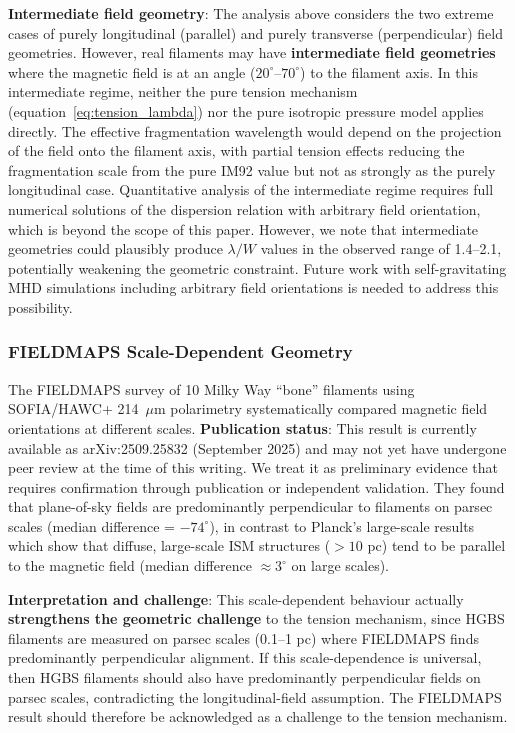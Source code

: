 \documentclass[11pt,a4paper]{article}
\begin{document}
\textbf{Intermediate field geometry}: The analysis above considers the two extreme cases of purely longitudinal (parallel) and purely transverse (perpendicular) field geometries. However, real filaments may have \textbf{intermediate field geometries} where the magnetic field is at an angle ($20^\circ$--$70^\circ$) to the filament axis. In this intermediate regime, neither the pure tension mechanism (equation~\ref{eq:tension_lambda}) nor the pure isotropic pressure model applies directly. The effective fragmentation wavelength would depend on the projection of the field onto the filament axis, with partial tension effects reducing the fragmentation scale from the pure IM92 value but not as strongly as the purely longitudinal case. Quantitative analysis of the intermediate regime requires full numerical solutions of the dispersion relation with arbitrary field orientation, which is beyond the scope of this paper. However, we note that intermediate geometries could plausibly produce $\lambda/W$ values in the observed range of 1.4--2.1, potentially weakening the geometric constraint. Future work with self-gravitating MHD simulations including arbitrary field orientations is needed to address this possibility.

\subsubsection{FIELDMAPS Scale-Dependent Geometry}

The FIELDMAPS survey of 10 Milky Way ``bone'' filaments \citep{Coude2025} using SOFIA/HAWC+ 214~$\mu$m polarimetry systematically compared magnetic field orientations at different scales. \textbf{Publication status}: This result is currently available as arXiv:2509.25832 (September 2025) and may not yet have undergone peer review at the time of this writing. We treat it as preliminary evidence that requires confirmation through publication or independent validation. They found that plane-of-sky fields are predominantly perpendicular to filaments on parsec scales (median difference = $-74^{\circ}$), in contrast to Planck's large-scale results which show that diffuse, large-scale ISM structures ($>10$ pc) tend to be parallel to the magnetic field (median difference $\approx 3^{\circ}$ on large scales).

\textbf{Interpretation and challenge}: This scale-dependent behaviour actually \textbf{strengthens the geometric challenge} to the tension mechanism, since HGBS filaments are measured on parsec scales (0.1--1 pc) where FIELDMAPS finds predominantly perpendicular alignment. If this scale-dependence is universal, then HGBS filaments should also have predominantly perpendicular fields on parsec scales, contradicting the longitudinal-field assumption. The FIELDMAPS result should therefore be acknowledged as a challenge to the tension mechanism.
\end{document}
